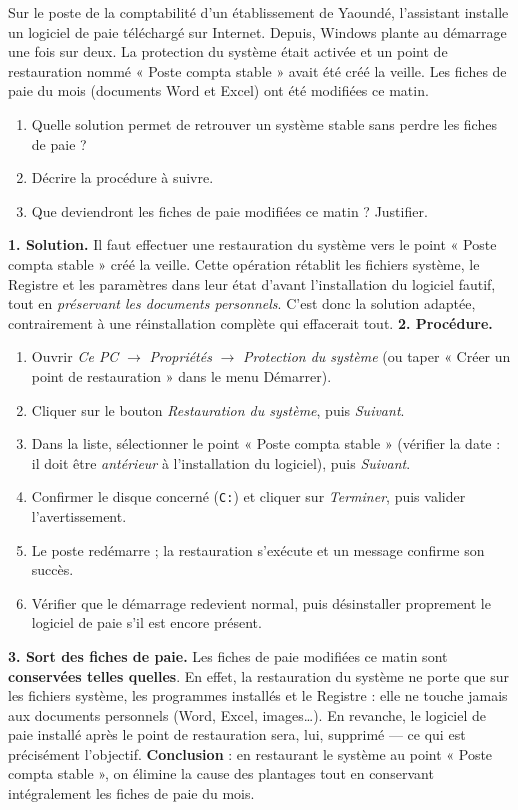 \documentclass[11pt]{article}
\newcommand{\cle}[1]{{\popxbold\color{popdark}#1}}
\begin{document}
\begin{exoresolu}
Sur le poste de la comptabilité d'un établissement de Yaoundé, l'assistant installe un logiciel de paie téléchargé sur Internet. Depuis, Windows plante au démarrage une fois sur deux. La protection du système était activée et un point de restauration nommé « Poste compta stable » avait été créé la veille. Les fiches de paie du mois (documents Word et Excel) ont été modifiées ce matin.
\begin{enumerate}
\item Quelle solution permet de retrouver un système stable sans perdre les fiches de paie ?
\item Décrire la procédure à suivre.
\item Que deviendront les fiches de paie modifiées ce matin ? Justifier.
\end{enumerate}
\tcblower
\textbf{1. Solution.} Il faut effectuer une \cle{restauration du système} vers le point « Poste compta stable » créé la veille. Cette opération rétablit les fichiers système, le Registre et les paramètres dans leur état d'avant l'installation du logiciel fautif, tout en \emph{préservant les documents personnels}. C'est donc la solution adaptée, contrairement à une réinstallation complète qui effacerait tout.
\textbf{2. Procédure.}
\begin{enumerate}
\item Ouvrir \emph{Ce PC} $\to$ \emph{Propriétés} $\to$ \emph{Protection du système} (ou taper « Créer un point de restauration » dans le menu Démarrer).
\item Cliquer sur le bouton \emph{Restauration du système}, puis \emph{Suivant}.
\item Dans la liste, sélectionner le point « Poste compta stable » (vérifier la date : il doit être \emph{antérieur} à l'installation du logiciel), puis \emph{Suivant}.
\item Confirmer le disque concerné (\texttt{C:}) et cliquer sur \emph{Terminer}, puis valider l'avertissement.
\item Le poste redémarre ; la restauration s'exécute et un message confirme son succès.
\item Vérifier que le démarrage redevient normal, puis désinstaller proprement le logiciel de paie s'il est encore présent.
\end{enumerate}
\textbf{3. Sort des fiches de paie.} Les fiches de paie modifiées ce matin sont \textbf{conservées telles quelles}. En effet, la restauration du système ne porte que sur les fichiers système, les programmes installés et le Registre : elle ne touche jamais aux documents personnels (Word, Excel, images\ldots). En revanche, le logiciel de paie installé après le point de restauration sera, lui, supprimé — ce qui est précisément l'objectif.
\textbf{Conclusion} : en restaurant le système au point « Poste compta stable », on élimine la cause des plantages tout en conservant intégralement les fiches de paie du mois.
\end{exoresolu}
\end{document}
